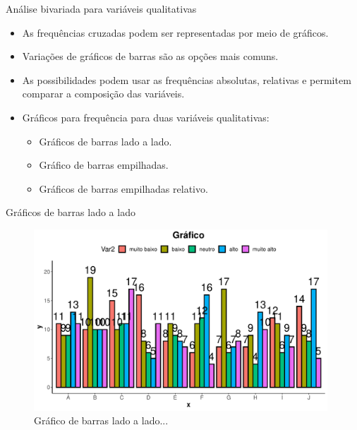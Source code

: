 \documentclass[
  ignorenonframetext,
  serif,
  professionalfont,
  usenames,
  dvipsnames,
  aspectratio = 169]{beamer}
\providecommand{\tightlist}{%
  \setlength{\itemsep}{0pt}\setlength{\parskip}{0pt}}
\renewcommand{\tightlist}{%
  \setlength{\itemsep}{0\baselineskip}
  \setlength{\parskip}{0.25\baselineskip}
}
\def\beginAHalfColumn{\begin{minipage}{0.49\textwidth}}%
\def\endColumns{\end{minipage}}%
\begin{document}
\begin{frame}{Análise bivariada para variáveis qualitativas}
\protect\hypertarget{anuxe1lise-bivariada-para-variuxe1veis-qualitativas-2}{}
\beginAHalfColumn

\begin{itemize}
\item
  As frequências cruzadas podem ser representadas por meio de gráficos.
\item
  Variações de gráficos de barras são as opções mais comuns.
\item
  As possibilidades podem usar as frequências absolutas, relativas e
  permitem comparar a composição das variáveis.
\end{itemize}

\endColumns
\beginAHalfColumn

\begin{itemize}
\tightlist
\item
  Gráficos para frequência para duas variáveis qualitativas:

  \begin{itemize}
  \tightlist
  \item
    Gráficos de barras lado a lado.
  \item
    Gráfico de barras empilhadas.
  \item
    Gráficos de barras empilhadas relativo.
  \end{itemize}
\end{itemize}

\endColumns
\end{frame}

\begin{frame}{Gráficos de barras lado a lado}
\protect\hypertarget{gruxe1ficos-de-barras-lado-a-lado}{}
\begin{figure}

{\centering \includegraphics[width=11cm]{202-exploratoria-bivariada_files/figure-beamer/unnamed-chunk-6-1} 

}

\caption{Gráfico de barras lado a lado...}\label{fig:unnamed-chunk-6}
\end{figure}
\end{frame}
\end{document}
